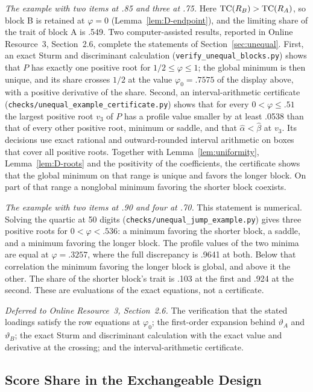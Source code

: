 \textit{The example with two items at .85 and three at .75.} Here $\operatorname{TC}(R_B)>\operatorname{TC}(R_A)$, so block B is retained at $\varphi=0$ (Lemma~\ref{lem:D-endpoint}), and the limiting share of the trait of block A is .549. Two computer-assisted results, reported in Online Resource~3, Section~2.6, complete the statements of Section~\ref{sec:unequal}. First, an exact Sturm and discriminant calculation (\texttt{verify\_unequal\_blocks.py}) shows that $P$ has exactly one positive root for $1/2\le\varphi\le1$; the global minimum is then unique, and its share crosses $1/2$ at the value $\varphi_0=.7575$ of the display above, with a positive derivative of the share. Second, an interval-arithmetic certificate (\texttt{checks/unequal\_example\_certificate.py}) shows that for every $0<\varphi\le.51$ the largest positive root $v_3$ of $P$ has a profile value smaller by at least .0538 than that of every other positive root, minimum or saddle, and that $\hat\alpha<\hat\beta$ at $v_3$. Its decisions use exact rational and outward-rounded interval arithmetic on boxes that cover all positive roots. Together with Lemma~\ref{lem:uniformity}, Lemma~\ref{lem:D-roots} and the positivity of the coefficients, the certificate shows that the global minimum on that range is unique and favors the longer block. On part of that range a nonglobal minimum favoring the shorter block coexists.

\textit{The example with two items at .90 and four at .70.} This statement is numerical. Solving the quartic at 50 digits (\texttt{checks/unequal\_jump\_example.py}) gives three positive roots for $0<\varphi<.536$: a minimum favoring the shorter block, a saddle, and a minimum favoring the longer block. The profile values of the two minima are equal at $\varphi=.3257$, where the full discrepancy is .9641 at both. Below that correlation the minimum favoring the longer block is global, and above it the other. The share of the shorter block's trait is .103 at the first and .924 at the second. These are evaluations of the exact equations, not a certificate.

\textit{Deferred to Online Resource~3, Section~2.6.} The verification that the stated loadings satisfy the row equations at $\varphi_0$; the first-order expansion behind $\vartheta_A$ and $\vartheta_B$; the exact Sturm and discriminant calculation with the exact value and derivative at the crossing; and the interval-arithmetic certificate.

\subsection{Score Share in the Exchangeable Design}
\label{app:score-share}

